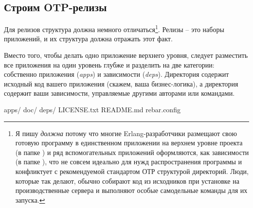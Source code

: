 \documentclass[11pt, oneside]{book}   	%
\begin{document}

\subsection{Строим OTP-релизы}
\label{subsec:building-otp-releases}

Для релизов структура должна немного отличаться\footnote{Я пишу \emph{должна} потому что многие Erlang-разработчики размещают свою готовую программу в единственном приложении на верхнем уровне проекта (в папке ) и ряд вспомогательных приложений оформляются, как зависимости (в папке ), что не совсем идеально для нужд распространения программы и конфликтует с рекомендуемой стандартом ОТР структурой директорий. Люди, которые так делают, обычно собирают код из исходников при установке на производственные сервера и выполняют особые самодельные команды для их запуска.}. Релизы -- это наборы приложений, и их структура должна отражать этот факт.

Вместо того, чтобы делать одно приложение верхнего уровня, следует разместить все приложения на один уровень глубже и разделить на две категории: собственно приложения (\emph{apps}) и зависимости (\emph{deps}). Директория  содержит исходный код вашего приложения (скажем, ваша бизнес-логика), а директория  содержит ваши зависимости, управляемые другими авторами или командами.

\begin{VerbatimRaw}
apps/
doc/
deps/
LICENSE.txt
README.md
rebar.config
\end{VerbatimRaw}
\end{document}
